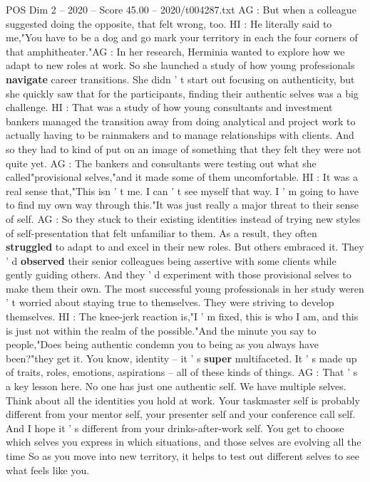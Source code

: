 \begin{textsample}{POS Dim 2 – 2020 – Score 45.00 – 2020/t004287.txt}
AG : But when a colleague suggested doing the opposite, that felt wrong, too.
HI : He literally said to me,"You have to be a dog and go mark your territory in each the four corners of that amphitheater."AG : In her research, Herminia wanted to explore how we adapt to new roles at work.
So she launched a study of how young professionals \textbf{navigate} career transitions.
She didn ' t start out focusing on authenticity, but she quickly saw that for the participants, finding their authentic selves was a big challenge.
HI : That was a study of how young consultants and investment bankers managed the transition away from doing analytical and project work to actually having to be rainmakers and to manage relationships with clients.
And so they had to kind of put on an image of something that they felt they were not quite yet.
AG : The bankers and consultants were testing out what she called"provisional selves,"and it made some of them uncomfortable.
HI : It was a real sense that,"This isn ' t me.
I can ' t see myself that way.
I ' m going to have to find my own way through this."It was just really a major threat to their sense of self.
AG : So they stuck to their existing identities instead of trying new styles of self-presentation that felt unfamiliar to them.
As a result, they often \textbf{struggled} to adapt to and excel in their new roles.
But others embraced it.
They ' d \textbf{observed} their senior colleagues being assertive with some clients while gently guiding others.
And they ' d experiment with those provisional selves to make them their own.
The most successful young professionals in her study weren ' t worried about staying true to themselves.
They were striving to develop themselves.
HI : The knee-jerk reaction is,"I ' m fixed, this is who I am, and this is just not within the realm of the possible."And the minute you say to people,"Does being authentic condemn you to being as you always have been?"they get it.
You know, identity -- it ' s \textbf{super} multifaceted.
It ' s made up of traits, roles, emotions, aspirations -- all of these kinds of things.
AG : That ' s a key lesson here.
No one has just one authentic self.
We have multiple selves.
Think about all the identities you hold at work.
Your taskmaster self is probably different from your mentor self, your presenter self and your conference call self.
And I hope it ' s different from your drinks-after-work self.
You get to choose which selves you express in which situations, and those selves are evolving all the time So as you move into new territory, it helps to test out different selves to see what feels like you.

\end{textsample}
